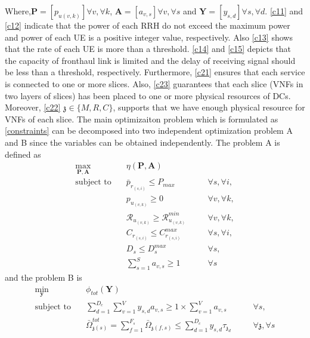 \documentclass[conference]{IEEEtran}
\begin{document}
Where,$\boldsymbol{P} =[p_{u(v,k)}]  \forall v , \forall k $, $\boldsymbol{A} =[a_{v,s}]  \forall v , \forall s $ and $\boldsymbol{Y} =[y_{s,d}]   \forall s ,  \forall d $. 
\eqref{c11} and \eqref{c12} indicate that the power of each RRH do not exceed the maximum power and power of each UE is a positive integer value, respectively. Also \eqref{c13} shows that the rate of each UE is more than a threshold. \eqref{c14} and \eqref{c15} depicts that the capacity of fronthaul link is limited and the delay of receiving signal should be less than a threshold, respectively.  
Furthermore, \eqref{c21}
ensures that each service is connected to one or more slices.
Also, \eqref{c23} guarantees that each slice (VNFs in two layers of slices) has been placed to one or more physical resources of DCs. Moreover, \eqref{c22}  $\mathfrak{z}\in \{M,R,C\}$, supports 
that we have enough physical resource for VNFs of each slice.\newline 
The main optimizaiton problem which is formulated as \eqref{constraints} can be decomposed into two independent optimization problem A and B since the variables can be obtained independently. The problem A is defined as 
\begin{subequations}
\begin{alignat}{4}
\max\limits_{\boldsymbol{P}, \boldsymbol{A} }   \quad &   \eta(\boldsymbol{P},\boldsymbol{A})\\
\text{subject to} \quad  & \bar{p}_{r_{(s,i)}} \leq P_{max} && \quad \forall s, \forall i,   \\
&p_{u_{(v,k)}}  \geq 0  &&\quad \forall v, \forall k, \\
&\mathcal{R}_{u_{(v,k)}} \geq  \mathcal{R}_{u_{(v,k)}}^{min} && \quad \forall v, \forall k, \\                                 
&C_{r_{(s,i)}} \leq C_{r_{(s,i)}}^{max}  &&\quad \forall s, \forall i,\label{cc14} \\
&D_{s} \leq D_{s}^{max}  &&\quad \forall s, \label{cc15} \\
& \sum_{s=1}^{S}a_{v,s} \geq 1 &&\quad \forall s
\end{alignat} 
\label{constraints1}
\end{subequations}
and the problem B is 
\begin{subequations}
\begin{alignat}{4}
\min\limits_{\boldsymbol{y} }   \quad &   \phi_{tot}(\boldsymbol{Y})\\
\text{subject to} \quad & \sum_{d=1}^{D_c}\sum_{v=1}^{V}y_{s,d}a_{v,s} \geq 1\times\sum_{v=1}^{V}a_{v,s} &&\quad \forall s, \\
&  \bar{\Omega}_{\mathfrak{z}(s)}^{tot} = \sum_{f=1}^{F_s}\bar{\Omega}_{\mathfrak{z}(f,s)} \leq  \sum_{d=1}^{D_c} y_{s,d} \tau_{\mathfrak{z}_d}                      
 && \quad \forall \mathfrak{z}, \forall s\label{eqomega}
\end{alignat}
\label{constraints2}
\end{subequations}
\end{document}
